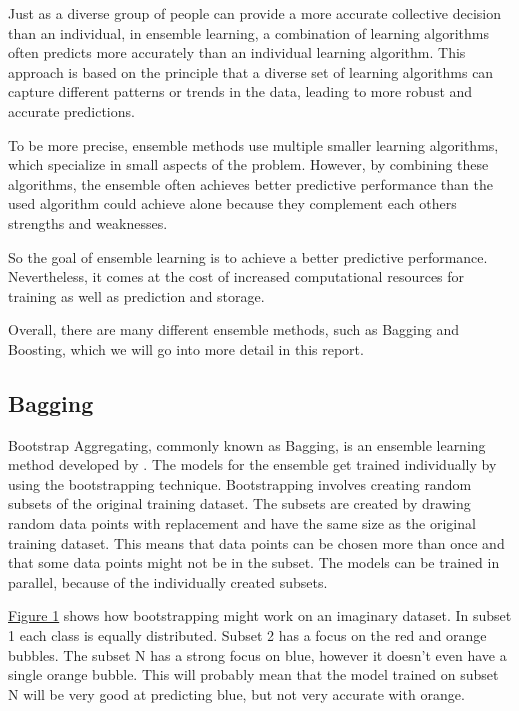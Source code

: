 Just as a diverse group of people can provide a more accurate collective decision 
than an individual, in ensemble learning, a combination of learning algorithms
often predicts more accurately than an individual learning algorithm.
This approach is based on the principle that a diverse set of learning algorithms
can capture different patterns or trends in the data, leading to more robust and 
accurate predictions.

To be more precise, ensemble methods use multiple smaller learning algorithms,
which specialize in small aspects of the problem. However, by combining these
algorithms, the ensemble often achieves better predictive performance than 
the used algorithm could achieve alone because they complement each others
strengths and weaknesses.

So the goal of ensemble learning is to achieve a better predictive performance.
Nevertheless, it comes at the cost of increased computational resources for 
training as well as prediction and storage.

Overall, there are many different ensemble methods, such as Bagging and Boosting, 
which we will go into more detail in this report.
\subsection{Bagging}

Bootstrap Aggregating, commonly known as Bagging, is an ensemble learning method
developed by \citet*{Breiman1996}. The models for the ensemble get trained individually
by using the bootstrapping technique. Bootstrapping involves creating random
subsets of the original training dataset. The subsets are created by drawing 
random data points with replacement and have the same size as the original
training dataset. This means that data points can be chosen more than once and
that some data points might not be in the subset. The models can be trained in
parallel, because of the individually created subsets.


\hyperref[fig:bootstrapping]{Figure 1} shows how bootstrapping might work on an imaginary dataset. In subset 1
each class is equally distributed. Subset 2 has a focus on the red and orange bubbles.
The subset N has a strong focus on blue, however it doesn't even have a single 
orange bubble. This will probably mean that the model trained on subset N will be very
good at predicting blue, but not very accurate with orange.

